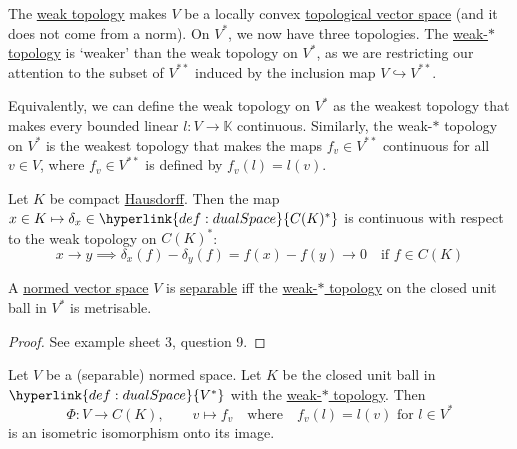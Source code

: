\documentclass{article}
\newcommand{\K}{\mathbb{K}}
\begin{document}
The \hyperlink{def:weaktop}{weak topology} makes $V$ be a locally convex \hyperlink{def:tVS}{topological vector space} (and it does not come from a norm). On $V^*$, we now have three topologies.
The \hyperlink{def:weaktop}{weak-$*$ topology} is `weaker' than the weak topology on $V^*$, as we are restricting our attention to the subset of $V^{**}$ induced by the inclusion map $V \hookrightarrow V^{**}$.


Equivalently, we can define the weak topology on $V^*$ as the weakest topology that makes every bounded linear $l: V \to \K$ continuous.
Similarly, the weak-$*$ topology on $V^*$ is the weakest topology that makes the maps $f_v \in V^{**}$ continuous for all $v \in V$, where $f_v \in V^{**}$ is defined by $f_v(l) = l(v)$.

\begin{eg}
    Let $K$ be compact \hyperlink{def:hausdorff}{Hausdorff}. Then the map $x \in K \mapsto \delta_x \in \hyperlink{def:dualSpace}{C(K)^*}$ is continuous with respect to the weak topology on $C(K)^*$:
    \begin{equation*}
        x \to y \implies \delta_x(f) - \delta_y(f) = f(x) - f(y) \to 0 \quad \text{if } f \in C(K)
    \end{equation*}
\end{eg}

\begin{thm}
    A \hyperlink{def:nvs}{normed vector space} $V$ is \hyperlink{def:separable}{separable} iff the \hyperlink{def:weaktop}{weak-$*$ topology} on the closed unit ball in $V^*$ is metrisable.
\end{thm}

\begin{proof}
    See example sheet 3, question 9.
\end{proof}


\begin{thm}
    Let $V$ be a (separable) normed space. Let $K$ be the closed unit ball in $\hyperlink{def:dualSpace}{V^*}$ with the \hyperlink{def:weaktop}{weak-$*$ topology}.
    Then
    \begin{equation*}
        \Phi: V \to C(K), \qquad v \mapsto f_v \quad \text{where} \quad f_v(l) = l(v) \text{ for } l \in V^*
    \end{equation*}
    is an isometric isomorphism onto its image.
\end{thm}
\end{document}
